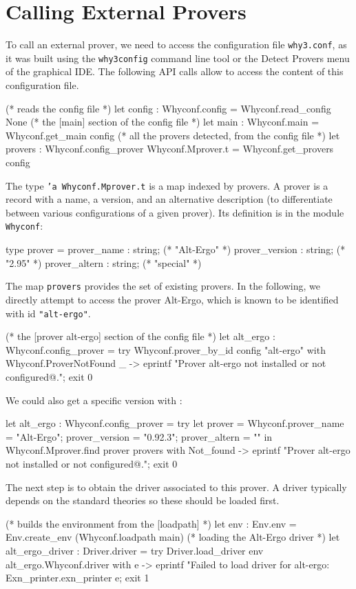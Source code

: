 \section{Calling External Provers}

To call an external prover, we need to access the \why configuration
file \texttt{why3.conf}, as it was built using the \texttt{why3config}
command line tool or the \textsf{Detect Provers} menu of the graphical
IDE. The following API calls allow to access the content of this
configuration file.
\begin{ocamlcode}
(* reads the config file *)
let config : Whyconf.config = Whyconf.read_config None
(* the [main] section of the config file *)
let main : Whyconf.main = Whyconf.get_main config
(* all the provers detected, from the config file *)
let provers : Whyconf.config_prover Whyconf.Mprover.t =
  Whyconf.get_provers config
\end{ocamlcode}
The type \texttt{'a Whyconf.Mprover.t} is a map indexed by provers. A
prover is a record with a name, a version, and an alternative description
(to differentiate between various configurations of a given prover). Its
definition is in the module \texttt{Whyconf}:
\begin{ocamlcode}
type prover =
    { prover_name : string; (* "Alt-Ergo" *)
      prover_version : string; (* "2.95" *)
      prover_altern : string; (* "special" *)
    }
\end{ocamlcode}
The map \texttt{provers} provides the set of existing provers.
In the following, we directly
attempt to access the prover Alt-Ergo, which is known to be identified
with id \texttt{"alt-ergo"}.
\begin{ocamlcode}
(* the [prover alt-ergo] section of the config file *)
let alt_ergo : Whyconf.config_prover =
  try
    Whyconf.prover_by_id config "alt-ergo"
  with Whyconf.ProverNotFound _ ->
    eprintf "Prover alt-ergo not installed or not configured@.";
    exit 0
\end{ocamlcode}
We could also get a specific version with :
\begin{ocamlcode}
let alt_ergo : Whyconf.config_prover =
  try
    let prover = {Whyconf.prover_name = "Alt-Ergo";
                  prover_version = "0.92.3";
                  prover_altern = ""} in
    Whyconf.Mprover.find prover provers
  with Not_found ->
    eprintf "Prover alt-ergo not installed or not configured@.";
    exit 0
\end{ocamlcode}

The next step is to obtain the driver associated to this prover. A
driver typically depends on the standard theories so these should be
loaded first.
\begin{ocamlcode}
(* builds the environment from the [loadpath] *)
let env : Env.env =
  Env.create_env (Whyconf.loadpath main)
(* loading the Alt-Ergo driver *)
let alt_ergo_driver : Driver.driver =
  try
    Driver.load_driver env alt_ergo.Whyconf.driver
  with e ->
    eprintf "Failed to load driver for alt-ergo: %
      Exn_printer.exn_printer e;
    exit 1
\end{ocamlcode}

